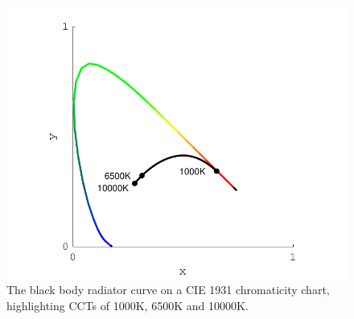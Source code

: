 \begin{figure}[htbp]
\includegraphics[max width=\textwidth]{figs/LitRev/BBR.pdf}
\caption{The black body radiator curve on a CIE 1931 chromaticity chart, highlighting \glspl{CCT} of 1000K, 6500K and 10000K.}
\label{fig:BBR}
\end{figure}

\clearpage